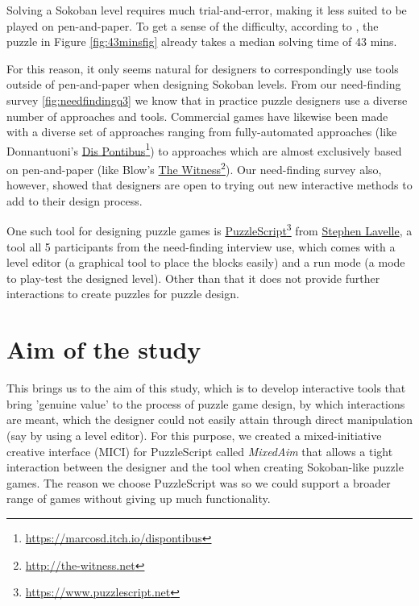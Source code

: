 Solving a Sokoban level requires much trial-and-error, making it less suited to be played on pen-and-paper. To get a sense of the difficulty, according to \cite{Pelanek2011}, the puzzle in Figure \ref{fig:43minsfig} already takes a median solving time of 43 mins.

For this reason, it only seems natural for designers to correspondingly use tools outside of pen-and-paper when designing Sokoban levels.  
From our need-finding survey \ref{fig:needfindingq3} we know that in practice puzzle designers use a diverse number of approaches and tools. Commercial games have likewise been made with a diverse set of approaches ranging from fully-automated approaches (like Donnantuoni's \href{https://marcosd.itch.io/dispontibus}{Dis Pontibus}\footnote{\url{https://marcosd.itch.io/dispontibus}}) to approaches which are almost exclusively based on pen-and-paper (like Blow's \href{http://the-witness.net}{\url{The Witness}}\footnote{\url{http://the-witness.net}}). Our need-finding survey also, however, showed that designers are open to trying out new interactive methods to add to their design process.

One such tool for designing puzzle games is \href{https://www.puzzlescript.net}{PuzzleScript}\footnote{\url{https://www.puzzlescript.net}} from \href{https://www.increpare.com}{Stephen Lavelle}, a tool all 5 participants from the need-finding interview use, which comes with a level editor (a graphical tool to place the blocks easily) and a run mode (a mode to play-test the designed level). Other than that it does not provide further interactions to create puzzles for puzzle design.


\section{Aim of the study}

This brings us to the aim of this study, which is to develop interactive tools that bring 'genuine value' to the process of puzzle game design, by which interactions are meant, which the designer could not easily attain through direct manipulation (say by using a level editor). For this purpose, we created a mixed-initiative creative interface (MICI) for PuzzleScript called \textit{MixedAim} that allows a tight interaction between the designer and the tool when creating Sokoban-like puzzle games. The reason we choose PuzzleScript was so we could support a broader range of games without giving up much functionality.

